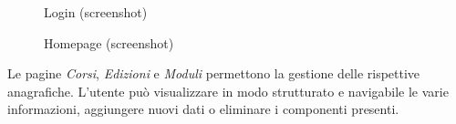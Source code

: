 \begin{figure}[!hbt]
\begin{minipage}[b]{0.3\textwidth}
    \caption{Login (screenshot)}
    \label{fig:login}
  \end{minipage}
  \hfill
  \begin{minipage}[b]{0.65\textwidth}
    \caption{Homepage (screenshot)}
    \label{fig:homepage}
  \end{minipage}
\end{figure}
\noindent
Le pagine \textit{Corsi}, \textit{Edizioni} e \textit{Moduli} permettono la gestione delle rispettive anagrafiche. L'utente può visualizzare in modo strutturato e navigabile le varie informazioni, aggiungere nuovi dati o eliminare i componenti presenti.

